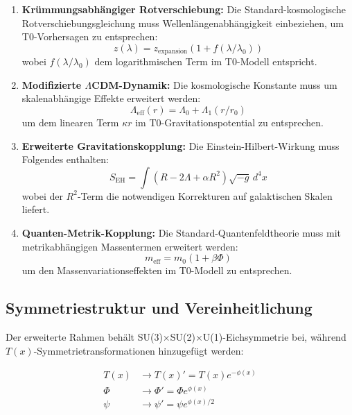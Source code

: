 \documentclass[12pt,a4paper]{article}
\newcommand{\Tfield}{T(x)}
\begin{document}
	\begin{enumerate}
		\item \textbf{Krümmungsabhängiger Rotverschiebung:} Die Standard-kosmologische Rotverschiebungsgleichung muss Wellenlängenabhängigkeit einbeziehen, um T0-Vorhersagen zu entsprechen:
		\begin{equation}
			z(\lambda) = z_{\text{expansion}} (1 + f(\lambda / \lambda_0))
		\end{equation}
		wobei $f(\lambda / \lambda_0)$ dem logarithmischen Term im T0-Modell entspricht.
		\item \textbf{Modifizierte $\Lambda$CDM-Dynamik:} Die kosmologische Konstante muss um skalenabhängige Effekte erweitert werden:
		\begin{equation}
			\Lambda_{\text{eff}}(r) = \Lambda_0 + \Lambda_1 (r / r_0)
		\end{equation}
		um dem linearen Term $\kappa r$ im T0-Gravitationspotential zu entsprechen.
		\item \textbf{Erweiterte Gravitationskopplung:} Die Einstein-Hilbert-Wirkung muss Folgendes enthalten:
		\begin{equation}
			S_{\text{EH}} = \int (R - 2 \Lambda + \alpha R^2) \sqrt{-g} \, d^4 x
		\end{equation}
		wobei der $R^2$-Term die notwendigen Korrekturen auf galaktischen Skalen liefert.
		\item \textbf{Quanten-Metrik-Kopplung:} Die Standard-Quantenfeldtheorie muss mit metrikabhängigen Massentermen erweitert werden:
		\begin{equation}
			m_{\text{eff}} = m_0 (1 + \beta \Phi)
		\end{equation}
		um den Massenvariationseffekten im T0-Modell zu entsprechen.
	\end{enumerate}
	
	\subsection{Symmetriestruktur und Vereinheitlichung}
	
	Der erweiterte Rahmen behält SU(3)$\times$SU(2)$\times$U(1)-Eichsymmetrie bei, während $\Tfield$-Symmetrietransformationen hinzugefügt werden:
	
	\begin{equation}
		\begin{aligned}
			\Tfield &\rightarrow \Tfield' = \Tfield e^{-\phi(x)} \\
			\Phi &\rightarrow \Phi' = \Phi e^{\phi(x)} \\
			\psi &\rightarrow \psi' = \psi e^{\phi(x)/2}
		\end{aligned}
	\end{equation}
	
\end{document}
